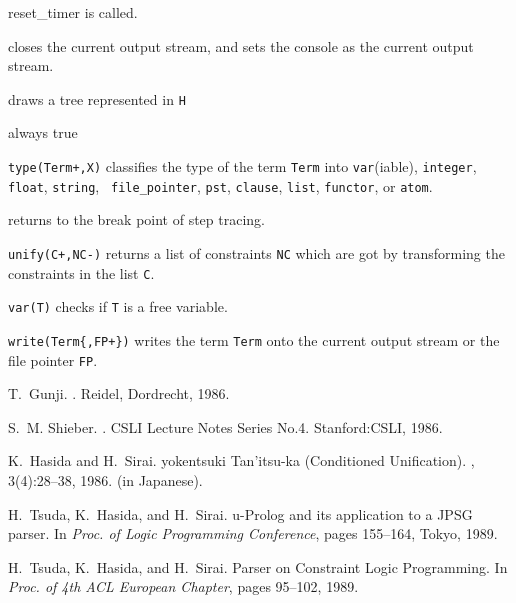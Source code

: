 \begin{description}
	reset\_timer is called. 
 \item [{\tt told/0}] closes the current output stream, and sets
	the console as the current  output stream.
 \item [{\tt tree(H)}]  draws a tree represented in {\tt H}
 \item [{\tt true/0}] always true
 \item [{\tt type/2}]  {\tt type(Term+,X)} classifies the type of the
	term {\tt Term}
	into {\tt var}(iable), {\tt integer}, {\tt float}, {\tt string}, {\tt
	file\_pointer}, {\tt pst}, {\tt clause}, {\tt list}, {\tt functor}, or
	{\tt atom}.  
 \item [{\tt unbreak/0}]  returns to the break point of step tracing.
 \item [{\tt unify/2}] {\tt unify(C+,NC-)} returns a list of constraints
        {\tt NC} which are
	got by transforming the constraints in the list {\tt C}.
 \item [{\tt var/1}] {\tt var(T)} checks if {\tt T} is a free variable.
 \item [{\tt write/1,2}]  {\tt write(Term\{,FP+\})} writes the term
	{\tt Term} onto the current output stream or  the file pointer 
        {\tt FP}.
\end{description}


\normalskip

\begin{thebibliography}{1}

T.~Gunji.
.
\newblock Reidel, Dordrecht, 1986.

S.~M. Shieber.
.
\newblock CSLI Lecture Notes Series No.4. Stanford:CSLI, 1986.

K.~Hasida and H.~Sirai.
yokentsuki {T}an'itsu-ka ({C}onditioned {U}nification).
, 3(4):28--38, 1986.
\newblock (in Japanese).

H.~Tsuda, K.~Hasida, and H.~Sirai.
u-{P}rolog and its application to a {JPSG} parser.
\newblock In {\em Proc. of Logic Programming Conference}, pages 155--164,
  Tokyo, 1989.

H.~Tsuda, K.~Hasida, and H.~Sirai.
 {P}arser on {C}onstraint {L}ogic {P}rogramming.
\newblock In {\em Proc. of 4th ACL European Chapter}, pages 95--102, 1989.

\end{thebibliography}


